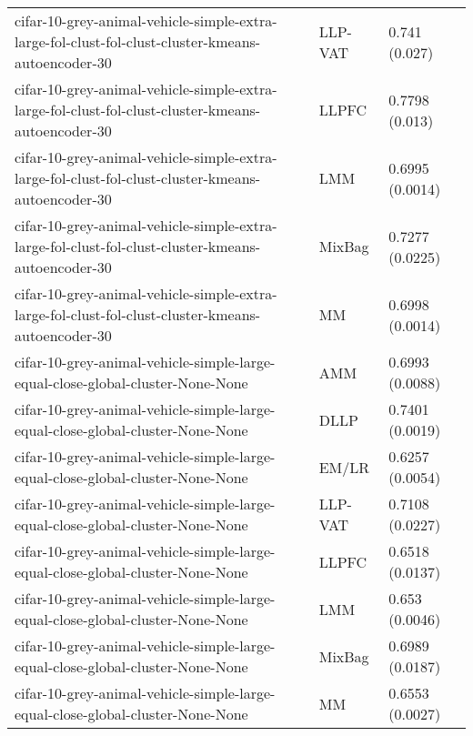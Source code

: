 \begin{longtable}{lll}
            cifar-10-grey-animal-vehicle-simple-extra-large-fol-clust-fol-clust-cluster-kmeans-autoencoder-30 &   LLP-VAT &                             0.741 (0.027) \\
            cifar-10-grey-animal-vehicle-simple-extra-large-fol-clust-fol-clust-cluster-kmeans-autoencoder-30 &     LLPFC &                            0.7798 (0.013) \\
            cifar-10-grey-animal-vehicle-simple-extra-large-fol-clust-fol-clust-cluster-kmeans-autoencoder-30 &       LMM &                           0.6995 (0.0014) \\
            cifar-10-grey-animal-vehicle-simple-extra-large-fol-clust-fol-clust-cluster-kmeans-autoencoder-30 &    MixBag &                           0.7277 (0.0225) \\
            cifar-10-grey-animal-vehicle-simple-extra-large-fol-clust-fol-clust-cluster-kmeans-autoencoder-30 &        MM &                           0.6998 (0.0014) \\
                               cifar-10-grey-animal-vehicle-simple-large-equal-close-global-cluster-None-None &       AMM &                           0.6993 (0.0088) \\
                               cifar-10-grey-animal-vehicle-simple-large-equal-close-global-cluster-None-None &      DLLP &                           0.7401 (0.0019) \\
                               cifar-10-grey-animal-vehicle-simple-large-equal-close-global-cluster-None-None &     EM/LR &                           0.6257 (0.0054) \\
                               cifar-10-grey-animal-vehicle-simple-large-equal-close-global-cluster-None-None &   LLP-VAT &                           0.7108 (0.0227) \\
                               cifar-10-grey-animal-vehicle-simple-large-equal-close-global-cluster-None-None &     LLPFC &                           0.6518 (0.0137) \\
                               cifar-10-grey-animal-vehicle-simple-large-equal-close-global-cluster-None-None &       LMM &                            0.653 (0.0046) \\
                               cifar-10-grey-animal-vehicle-simple-large-equal-close-global-cluster-None-None &    MixBag &                           0.6989 (0.0187) \\
                               cifar-10-grey-animal-vehicle-simple-large-equal-close-global-cluster-None-None &        MM &                           0.6553 (0.0027) \\

\end{longtable}
